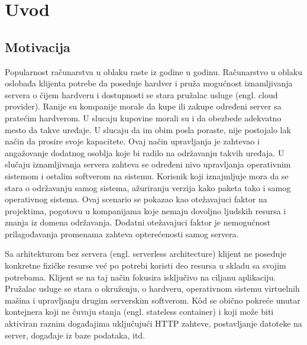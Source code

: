 \documentclass[12pt,oneside]{memoir}
\begin{document}
\frontmatter
\naslovna
\komisija
\apstrakt
\tableofcontents*

\mainmatter

\chapter{Uvod}

\section{Motivacija}
Popularnost računarstva u oblaku raste iz godine u godinu. Računarstvo u oblaku oslobađa klijenta potrebe da poseduje hardver i pruža mogućnost iznamljivanja servera o čijem hardveru i dostupnosti se stara pružalac usluge (engl. cloud provider). Ranije su kompanije morale da kupe ili zakupe određeni server sa pratećim hardverom. U slucaju kupovine morali su i da obezbede adekvatno mesto da takve uređaje. U slucaju da im obim posla poraste, nije postojalo lak način da prosire svoje kapacitete. Ovaj način upravljanja je zahtevao i angažovanje dodatnog osoblja koje bi radilo na održavanju takvih uređaja. U slučaju iznamljivanja servera zahteva se određeni nivo upravljanja operativnim sistemom i ostalim softverom na sistemu. Korisnik koji iznajmljuje mora da se stara o održavanju samog sistema, ažuriranju verzija kako paketa tako i samog operativnog sistema. Ovaj scenario se pokazao kao otežavajuci faktor na projektima, pogotovu u kompanijama koje nemaju dovoljno ljudskih resursa i znanja iz domena održavanja. Dodatni otežavajuci faktor je nemogućnost prilagođavanja promenama zahteva opterećenosti samog servera. 

Sa arhitekturom bez servera (engl. serverless architecture) klijent ne poseduje konkretne fizičke resurse već po potrebi koristi deo resursa u skladu sa svojim potrebama. Klijent se na taj način fokusira isključivo na ciljanu aplikaciju. Pružalac usluge se stara o okruženju, o hardveru, operativnom sistemu virtuelnih mašina i upravljanju drugim serverskim softverom. Kôd se obično pokreće unutar kontejnera koji ne čuvaju stanja (engl. stateless container) i koji može biti aktiviran raznim događajima uključujući HTTP zahteve, postavljanje datoteke na server, događaje iz baze podataka, itd.
\end{document}

